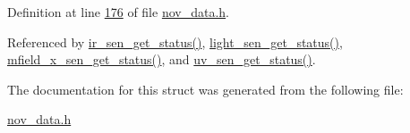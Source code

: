 Definition at line \hyperlink{a00022_source_l00176}{176} of file \hyperlink{a00022_source}{nov\+\_\+data.\+h}.



Referenced by \hyperlink{a00045_source_l00302}{ir\+\_\+sen\+\_\+get\+\_\+status()}, \hyperlink{a00047_source_l00204}{light\+\_\+sen\+\_\+get\+\_\+status()}, \hyperlink{a00050_source_l00276}{mfield\+\_\+x\+\_\+sen\+\_\+get\+\_\+status()}, and \hyperlink{a00073_source_l00302}{uv\+\_\+sen\+\_\+get\+\_\+status()}.



The documentation for this struct was generated from the following file\+:\begin{DoxyCompactItemize}
\item 
\hyperlink{a00022}{nov\+\_\+data.\+h}\end{DoxyCompactItemize}
